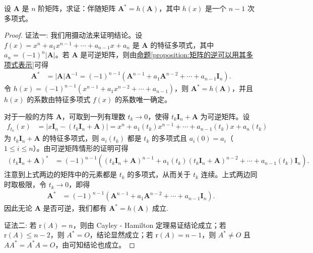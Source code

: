 \documentclass[../../main.tex]{subfiles}
\begin{document}
\begin{proposition}\label{proposition:伴随矩阵可原矩阵的多项式表示}
设 \(\boldsymbol{A}\) 是 \(n\) 阶矩阵，求证：伴随矩阵 \(\boldsymbol{A}^* = h(\boldsymbol{A})\)，其中 \(h(x)\) 是一个 \(n - 1\) 次多项式。
\end{proposition}
\begin{proof}
{\color{blue}证法一:}
我们用摄动法来证明结论。设 \(f(x)=x^n + a_1x^{n - 1}+\cdots + a_{n - 1}x + a_n\) 是 \(\boldsymbol{A}\) 的特征多项式，其中 \(a_n = (-1)^n|\boldsymbol{A}|\)。若 \(\boldsymbol{A}\) 是可逆矩阵，则由\hyperref[proposition:矩阵的逆可以用其多项式表示]{命题\ref{proposition:矩阵的逆可以用其多项式表示}}可得
\begin{align*}
\boldsymbol{A}^*&=|\boldsymbol{A}|\boldsymbol{A}^{-1}=(-1)^{n - 1}(\boldsymbol{A}^{n - 1}+a_1\boldsymbol{A}^{n - 2}+\cdots + a_{n - 1}\boldsymbol{I}_n).
\end{align*}
令 \(h(x)=(-1)^{n - 1}(x^{n - 1}+a_1x^{n - 2}+\cdots + a_{n - 1})\)，则 \(\boldsymbol{A}^* = h(\boldsymbol{A})\)，并且 \(h(x)\) 的系数由特征多项式 \(f(x)\) 的系数唯一确定。

对于一般的方阵 \(\boldsymbol{A}\)，可取到一列有理数 \(t_k\rightarrow 0\)，使得 \(t_k\boldsymbol{I}_n+\boldsymbol{A}\) 为可逆矩阵。设
\begin{align*}
f_{t_k}(x)&=|x\boldsymbol{I}_n-(t_k\boldsymbol{I}_n+\boldsymbol{A})|=x^n + a_1(t_k)x^{n - 1}+\cdots + a_{n - 1}(t_k)x + a_n(t_k)
\end{align*}
为 \(t_k\boldsymbol{I}_n+\boldsymbol{A}\) 的特征多项式，则 \(a_i(t_k)\) 都是 \(t_k\) 的多项式且 \(a_i(0)=a_i\)（\(1\leq i\leq n\)）。由可逆矩阵情形的证明可得
\begin{align*}
(t_k\boldsymbol{I}_n+\boldsymbol{A})^*&=(-1)^{n - 1}\left((t_k\boldsymbol{I}_n+\boldsymbol{A})^{n - 1}+a_1(t_k)(t_k\boldsymbol{I}_n+\boldsymbol{A})^{n - 2}+\cdots + a_{n - 1}(t_k)\boldsymbol{I}_n\right).
\end{align*}
注意到上式两边的矩阵中的元素都是 \(t_k\) 的多项式，从而关于 \(t_k\) 连续。上式两边同时取极限，令 \(t_k\rightarrow 0\)，即得
\begin{align*}
\boldsymbol{A}^*&=(-1)^{n - 1}(\boldsymbol{A}^{n - 1}+a_1\boldsymbol{A}^{n - 2}+\cdots + a_{n - 1}\boldsymbol{I}_n).
\end{align*}
因此无论 \(\boldsymbol{A}\) 是否可逆，我们都有 \(\boldsymbol{A}^* = h(\boldsymbol{A})\) 成立.

{\color{blue}证法二:}
若 $\mathrm{r}(A)=n$，则由 Cayley - Hamilton 定理易证结论成立；若 $\mathrm{r}(A)\leq n - 2$，则 $A^* = O$，结论显然成立；若 $\mathrm{r}(A)=n - 1$，则 $A^*\neq O$ 且 $AA^* = A^*A = O$，由可知结论也成立。
\end{proof}
\end{document}
